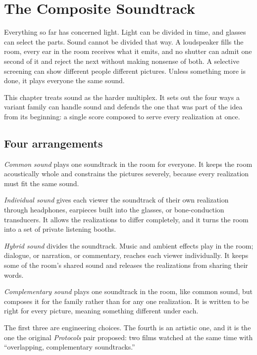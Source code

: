 \chapter{The Composite Soundtrack}\label{ch:composite-sound}

Everything so far has concerned light. Light can be divided in time, and glasses can select the parts. Sound cannot be divided that way. A loudspeaker fills the room, every ear in the room receives what it emits, and no shutter can admit one second of it and reject the next without making nonsense of both. A selective screening can show different people different pictures. Unless something more is done, it plays everyone the same sound.

This chapter treats sound as the harder multiplex. It sets out the four ways a variant family can handle sound and defends the one that was part of the idea from its beginning: a single score composed to serve every realization at once.

\section{Four arrangements}

\emph{Common sound} plays one soundtrack in the room for everyone. It keeps the room acoustically whole and constrains the pictures severely, because every realization must fit the same sound.

\emph{Individual sound} gives each viewer the soundtrack of their own realization through headphones, earpieces built into the glasses, or bone-conduction transducers. It allows the realizations to differ completely, and it turns the room into a set of private listening booths.

\emph{Hybrid sound} divides the soundtrack. Music and ambient effects play in the room; dialogue, or narration, or commentary, reaches each viewer individually. It keeps some of the room's shared sound and releases the realizations from sharing their words.

\emph{Complementary sound} plays one soundtrack in the room, like common sound, but composes it for the family rather than for any one realization. It is written to be right for every picture, meaning something different under each.

The first three are engineering choices. The fourth is an artistic one, and it is the one the original \emph{Protocols} pair proposed: two films watched at the same time with ``overlapping, complementary soundtracks.''

